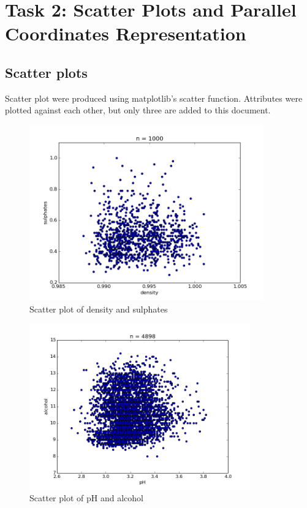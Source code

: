 \documentclass[12pt]{article}
\begin{document}
\section{Task 2: Scatter Plots and Parallel Coordinates Representation}

\subsection{Scatter plots}

Scatter plot were produced using matplotlib's scatter function. Attributes were plotted against each other, but only three are added to this document.

\begin{figure}[H]
    \centering
    \includegraphics[width=0.9\textwidth]{scatter_plot_density_sulphates}
    \caption{Scatter plot of density and sulphates}
    \label{fig:scatter_dens_sulph}
\end{figure}

\begin{figure}[H]
    \centering
    \includegraphics[width=0.85\textwidth]{scatter_plot_pH_alcohol}
    \caption{Scatter plot of pH and alcohol}
    \label{fig:scatter_ph_alc}
\end{figure}
\end{document}
